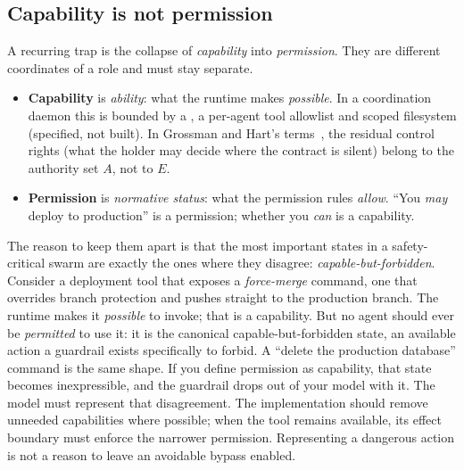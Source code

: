 \documentclass[11pt,a4paper]{article}
\theoremstyle{definition}
\begin{document}


\subsection{Capability is not permission}

A recurring trap is the
collapse of \emph{capability} into \emph{permission}. They are different
coordinates of a role and must stay separate.

\begin{itemize}[leftmargin=1.4em]
  \item \textbf{Capability} is \emph{ability}: what the runtime makes
  \emph{possible}. In a coordination daemon this is bounded by a
  , a per-agent tool allowlist and scoped filesystem
  (specified, not built). In Grossman and Hart's terms~,
  the residual control rights (what the holder may decide where the contract is
  silent) belong to the authority set $A$, not to $E$.
  \item \textbf{Permission} is \emph{normative status}: what the permission
  rules \emph{allow}. ``You \emph{may} deploy to production'' is a permission; whether
  you \emph{can} is a capability.
\end{itemize}

\noindent The reason to keep them apart is that the most important states in a
safety-critical swarm are exactly the ones where they disagree:
\emph{capable-but-forbidden}. Consider a deployment tool that exposes a
\emph{force-merge} command, one that overrides branch protection and pushes
straight to the production branch. The runtime makes it \emph{possible} to invoke;
that is a capability. But no agent should ever be \emph{permitted} to use it: it is
the canonical capable-but-forbidden state, an available action a guardrail exists
specifically to forbid. A ``delete the production database'' command is the same
shape. If you define permission as capability, that state becomes inexpressible,
and the guardrail drops out of your model with it. The model must represent that disagreement. The implementation should remove
unneeded capabilities where possible; when the tool remains available, its
effect boundary must enforce the narrower permission. Representing a dangerous
action is not a reason to leave an avoidable bypass enabled.

\end{document}
